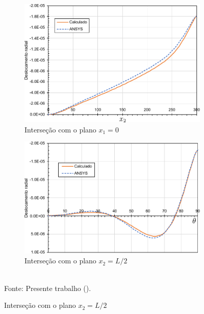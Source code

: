 \begin{figure}[h!]
    \centering
    \caption{Cilindro biengastado em problema estático - Deslocamentos radiais.}
    \begin{subfigure}{0.49\textwidth}
        \includegraphics[width=\linewidth]{Figuras/cylinder-shell/deslocamento1.pdf}
        \caption{Interseção com o plano $x_1=0$}
    \end{subfigure}
    \begin{subfigure}{0.49\textwidth}
        \includegraphics[width=\linewidth]{Figuras/cylinder-shell/deslocamento2.pdf}
        \caption{Interseção com o plano $x_2=L/2$}
    \end{subfigure}
    \\Fonte: Presente trabalho (\the\year).
    \label{fig:cylinder-shell-deslradial}
\end{figure}


